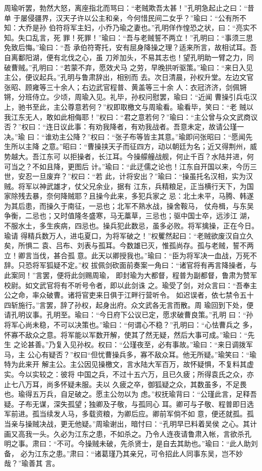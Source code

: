 周瑜听罢，勃然大怒，离座指北而骂曰：“老贼欺吾太甚！”孔明急起止之曰：“昔单
于屡侵疆界，汉天子许以公主和亲，今何惜民间二女乎？”瑜曰：“公有所不知：大乔是孙
伯符将军主妇，小乔乃瑜之妻也。”孔明佯作惶恐之状，曰：“亮实不知。失口乱言，死
罪！死罪！”瑜曰：“吾与老贼誓不两立！”孔明曰：“事须三思免致后悔。”瑜曰：“吾
承伯符寄托，安有屈身降操之理？适来所言，故相试耳。吾自离鄱阳湖，便有北伐之心，虽
刀斧加头，不易其志也！望孔明助一臂之力，同破曹贼。”孔明曰：“若蒙不弃，愿效犬马
之劳，早晚拱听驱策。”瑜曰：“来日入见主公，便议起兵。”孔明与鲁肃辞出，相别而
去。次日清晨，孙权升堂。左边文官张昭、顾雍等三十余人；右边武官程普、黄盖等三十余
人：衣冠济济，剑佩锵锵，分班侍立。少顷，周瑜入见。礼毕，孙权问慰罢，瑜曰：“近闻
曹操引兵屯汉上，驰书至此，主公尊意若何？”权即取檄文与周瑜看。瑜看毕，笑曰：“老
贼以我江东无人，敢如此相侮耶！”权曰：“君之意若何？”瑜曰：“主公曾与众文武商议
否？”权曰：“连日议此事：有劝我降者，有劝我战者。吾意未定，故请公瑾一决。”瑜
曰：“谁劝主公降？”权曰：“张子布等皆主其意。”瑜即问张昭曰：“愿闻先生所以主降
之意。”昭曰：“曹操挟天子而征四方，动以朝廷为名；近又得荆州，威势越大。吾江东可
以拒操者，长江耳。今操艨艟战舰，何止千百？水陆并进，何可当之？不如且降，更图后
计。”瑜曰：“此迂儒之论也！江东自开国以来，今历三世，安忍一旦废弃？”权曰：“若
此，计将安出？”瑜曰：“操虽托名汉相，实为汉贼。将军以神武雄才，仗父兄余业，据有
江东，兵精粮足，正当横行天下，为国家除残去暴，奈何降贼耶？且操今此来，多犯兵家之
忌：北土未平，马腾、韩遂为其后患，而操久于南征，一忌也；北军不熟水战，操舍鞍马，
仗舟楫，与东吴争衡，二忌也；又时值隆冬盛寒，马无藁草，三忌也；驱中国士卒，远涉江
湖，不服水土，多生疾病，四忌也。操兵犯此数忌，虽多必败。将军擒操，正在今日。瑜请
得精兵数万人，进屯夏口，为将军破之！”权矍然起曰：“老贼欲废汉自立久矣，所惧二
袁、吕布、刘表与孤耳。今数雄已灭，惟孤尚存。孤与老贼，誓不两立！卿言当伐，甚合孤
意。此天以卿授我也。”瑜曰：“臣为将军决一血战，万死不辞。只恐将军狐疑不定。”权
拔佩剑砍面前奏案一角曰：“诸官将有再言降操者，与此案同！”言罢，便将此剑赐周瑜，
即封瑜为大都督，程普为副都督，鲁肃为赞军校尉。如文武官将有不听号令者，即以此剑诛
之。瑜受了剑，对众言曰：“吾奉主公之命，率众破曹。诸将官吏来日俱于江畔行营听令。
如迟误者，依七禁令五十四斩施行。”言罢，辞了孙权，起身出府。众文武各无言而散。周
瑜回到下处，便请孔明议事。孔明至。瑜曰：“今日府下公议已定，愿求破曹良策。”孔明
曰：“孙将军心尚未稳，不可以决策也。”瑜曰：“何谓心不稳？”孔明曰：“心怯曹兵之
多，怀寡不敌众之意。将军能以军数开解，使其了然无疑，然后大事可成。”瑜曰：“先生
之论甚善。”乃复入见孙权。权曰：“公瑾夜至，必有事故。”瑜曰：“来日调拨军马，主
公心有疑否？”权曰“但忧曹操兵多，寡不敌众耳。他无所疑。”瑜笑曰：“瑜特为此来开
解主公。主公因见操檄文，言水陆大军百万，故怀疑惧，不复料其虚实。今以实较之：彼将
中国之兵，不过十五六万，且已久疲；所得袁氏之众，亦止七八万耳，尚多怀疑未服。夫以
久疲之卒，御狐疑之众，其数虽多，不足畏也。瑜得五万兵，自足破之。愿主公勿以为
虑。”权抚瑜背曰：“公瑾此言，足释吾疑。子布无谋，深失孤望；独卿及子敬，与孤同心
耳。卿可与子敬、程普即日选军前进。孤当续发人马，多载资粮，为卿后应。卿前军倘不如
意，便还就孤。孤当亲与操贼决战，更无他疑。”周瑜谢出，暗忖曰：“孔明早已料着吴侯
之心。其计画又高我一头。久必为江东之患，不如杀之。乃令人连夜请鲁肃入帐，言欲杀孔
明之事。肃曰：“不可。今操贼未破，先杀贤士，是自去其助也。”瑜曰：“此人助刘备，
必为江东之患。”肃曰：“诸葛瑾乃其亲兄，可令招此人同事东吴，岂不妙哉？”瑜善其
言。

